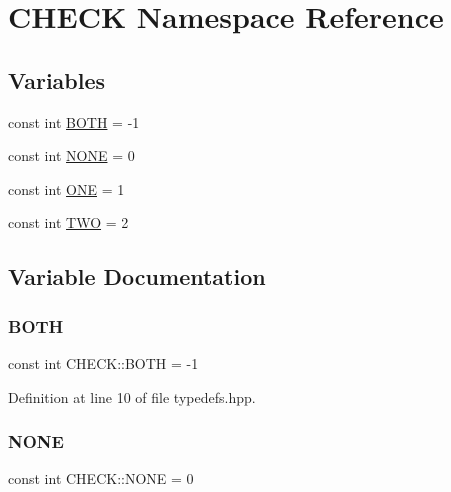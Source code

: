 \hypertarget{namespace_c_h_e_c_k}{}\section{C\+H\+E\+CK Namespace Reference}
\label{namespace_c_h_e_c_k}
\subsection*{Variables}
\begin{DoxyCompactItemize}
\item 
const int \hyperlink{namespace_c_h_e_c_k_a3acda1c74bfabb5b6b67e19d0ad2d52a}{B\+O\+TH} = -\/1
\item 
const int \hyperlink{namespace_c_h_e_c_k_a35fad085a9d64167bd4550445c4dc9e1}{N\+O\+NE} = 0
\item 
const int \hyperlink{namespace_c_h_e_c_k_acf8ecf93ddfb75456112712630f8f722}{O\+NE} = 1
\item 
const int \hyperlink{namespace_c_h_e_c_k_a2b112aaec4c59311376a5a60f291aa48}{T\+WO} = 2
\end{DoxyCompactItemize}


\subsection{Variable Documentation}
\mbox{\label{namespace_c_h_e_c_k_a3acda1c74bfabb5b6b67e19d0ad2d52a}} 
\subsubsection{\texorpdfstring{B\+O\+TH}{BOTH}}
{\footnotesize\ttfamily const int C\+H\+E\+C\+K\+::\+B\+O\+TH = -\/1}



Definition at line 10 of file typedefs.\+hpp.

\mbox{\label{namespace_c_h_e_c_k_a35fad085a9d64167bd4550445c4dc9e1}} 
\subsubsection{\texorpdfstring{N\+O\+NE}{NONE}}
{\footnotesize\ttfamily const int C\+H\+E\+C\+K\+::\+N\+O\+NE = 0}



